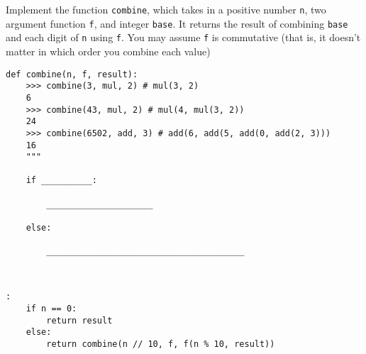 \begin{blocksection}
\question Implement the function \texttt{combine}, which takes in a positive number \texttt{n}, two argument function \texttt{f}, and integer \texttt{base}. It returns the result of combining \texttt{base} and each digit of \texttt{n} using \texttt{f}. You may assume \texttt{f} is commutative (that is, it doesn't matter in which order you combine each value)

\begin{lstlisting}
def combine(n, f, result):
    >>> combine(3, mul, 2) # mul(3, 2)
    6
    >>> combine(43, mul, 2) # mul(4, mul(3, 2))
    24
    >>> combine(6502, add, 3) # add(6, add(5, add(0, add(2, 3)))
    16
    """
		
    if __________:
    
        _____________________
    
    else:
    
        _______________________________________

				
\end{lstlisting}

\begin{solution}[1in]
\begin{lstlisting}:
    if n == 0:
        return result
    else:
        return combine(n // 10, f, f(n % 10, result))
\end{lstlisting}
\end{solution}
\end{blocksection}
